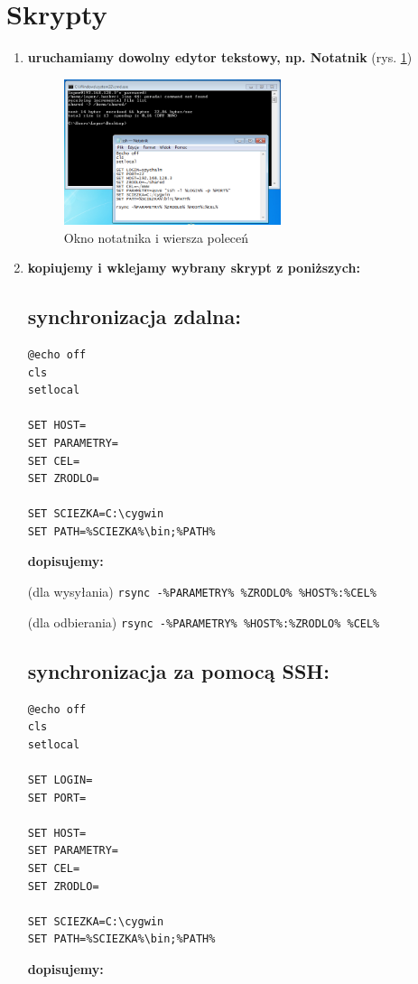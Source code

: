 \newpage
\section{Skrypty}
\begin{enumerate}
\item \textbf{uruchamiamy dowolny edytor tekstowy, np. Notatnik} (rys. \ref{cmd})
\begin{figure}[h!]
	\centering
	\includegraphics[width=0.6\textwidth]{../img/cmd.jpg}
	\caption{Okno notatnika i wiersza poleceń}
	\label{cmd}
\end{figure}
\item \textbf{kopiujemy i wklejamy wybrany skrypt z poniższych:}
\subsection*{synchronizacja zdalna:}
\begin{verbatim}
@echo off
cls
setlocal

SET HOST=
SET PARAMETRY=
SET CEL=
SET ZRODLO=

SET SCIEZKA=C:\cygwin
SET PATH=%SCIEZKA%\bin;%PATH%
\end{verbatim}

\textbf{dopisujemy:}

(dla wysyłania)
\verb|rsync -%PARAMETRY% %ZRODLO% %HOST%:%CEL%|

(dla odbierania)
\verb|rsync -%PARAMETRY% %HOST%:%ZRODLO% %CEL%|

\subsection*{synchronizacja za pomocą SSH:}
\begin{verbatim}
@echo off
cls
setlocal

SET LOGIN=
SET PORT=

SET HOST=
SET PARAMETRY=
SET CEL=
SET ZRODLO=

SET SCIEZKA=C:\cygwin
SET PATH=%SCIEZKA%\bin;%PATH%
\end{verbatim}
\textbf{dopisujemy:}


\end{enumerate}
